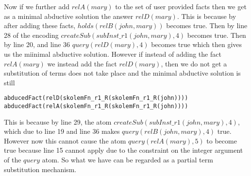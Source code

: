 \documentclass{article}
\begin{document}
Now if we further add $relA(mary)$ to the set of user provided facts then we get as a minimal abductive solution the answer $relD(mary)$. This is because by after adding these facts, $holds(relB(john,mary))$ becomes true. Then by line 28 of the encoding   $createSub(subInst\_r1(john,mary),4)$ becomes true. Then by line 20, and line 36 $query(relD(mary),4)$ becomes true which then gives us the miinimal abductive solution. However if instead of adding the fact $relA(mary)$ we instead add the fact $relD(mary)$, then we do not get a  substitution of terms does not take place and the minimal abductive solution is still \begin{verbatim}
abducedFact(relD(skolemFn_r1_R(skolemFn_r1_R(john))))
abducedFact(relA(skolemFn_r1_R(skolemFn_r1_R(john))))    
\end{verbatim} This is because by line 29, the atom $createSub(subInst\_r1(john,mary),4)$, which due to line 19 and line 36 makes $query(relB(john,mary),4)$ true. However now this cannot cause the atom $query(relA(mary),5)$ to become true because line 15 cannot apply due to the constraint on the integer argument of the $query$ atom. So what we have can be regarded as a partial term substitution mechanism.  
\end{document}
